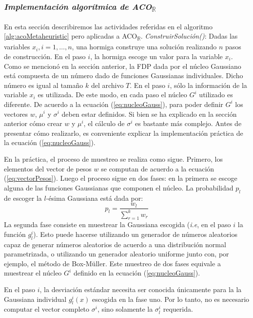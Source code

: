 \documentclass{llncs}
\begin{document}
	\subsubsection{\textit{Implementación algorítmica de ACO\textsubscript{$\mathbb{R}$}}}
	En esta sección describiremos las actividades referidas en el algoritmo  \ref{alg:acoMetaheuristic} pero aplicadas a ACO\textsubscript{$\mathbb{R}$}.
	\bigbreak
	\textit{ConstruirSolución()}: Dadas las variables $x_i, i = 1, \dots, n$, una hormiga construye una solución realizando $n$ pasos de
	construcción. En el paso $i$, la hormiga escoge un valor para la variable $x_i$. Como se mencionó en la sección anterior, la FDP dada
	por el núcleo Gaussiano está compuesta de un número dado de funciones Gaussianas individuales. Dicho número es igual al tamaño
	$k$ del archivo $T$. En el paso $i$, sólo la información de la variable $x_i$ es utilizada. De este modo, en cada paso el núcleo $G^i$
	utilizado es diferente. De acuerdo a la ecuación (\ref{eq:nucleoGauss}), para poder definir $G^i$ los vectores $w$, $\mu^i$ y 
	$\sigma^i$ deben estar definidos. Si bien se ha explicado en la sección anterior cómo crear $w$ y $\mu^i$, el cálculo de 
	$\sigma^i$ es bastante más complejo. Antes de presentar cómo realizarlo, es conveniente explicar la implementación práctica de la
	ecuación (\ref{eq:nucleoGauss}).
	
	En la práctica, el proceso de muestreo se realiza como sigue. Primero, los elementos del vector de pesos $w$ se computan de
	acuerdo a la ecuación (\ref{eq:vectorPesos}). Luego el proceso sigue en dos fases: en la primera se escoge alguna de las funciones
	Gaussianas que componen el núcleo. La probabilidad $p_l$ de escoger la $l$-ésima Gaussiana está dada por:
	\begin{equation*}
	p_l = \frac{w_l}{\sum_{r=1}^{k}w_r}
	\end{equation*}
	La segunda fase consiste en muestrear la Gaussiana escogida (\textit{i.e}, en el paso $i$ la función $g_l^i$). Esto puede hacerse
	utilizando un generador de números aleatorios capaz de generar números aleatorios de acuerdo a una distribución normal
	parametrizada, o utilizando un generador aleatorio uniforme junto con, por ejemplo, el método de Box-Müller. Este muestreo de dos
	fases equivale a muestrear el núcleo $G^i$ definido en la ecuación (\ref{eq:nucleoGauss}).
	
	En el paso $i$, la desviación estándar necesita ser conocida únicamente para la la Gaussiana individual $g_l^i(x)$ escogida en la fase
	uno. Por lo tanto, no es necesario computar el vector completo $\sigma^i$, sino solamente la $\sigma^i_l$ requerida.
		
\end{document}
